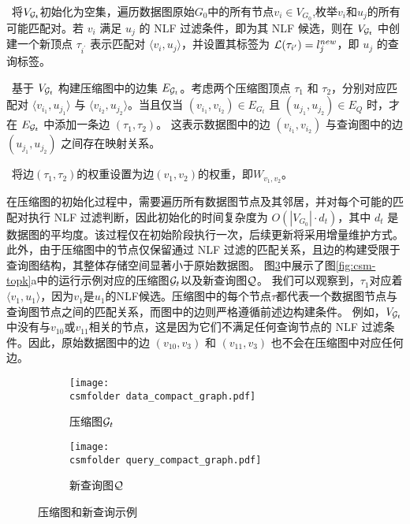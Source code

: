 \textbullet~将$V_{\mathcal{G}_t}$初始化为空集，遍历数据图原始$G_0$中的所有节点$v_i\in V_{G_0}$,枚举$v_i$和$u_j$的所有可能匹配对。若 $v_i$ 满足 $u_j$ 的 NLF 过滤条件，即为其 NLF 候选，则在 $V_{\mathcal{G}_t}$ 中创建一个新顶点 $\tau_{i^\prime}$ 表示匹配对 $\langle v_i, u_j \rangle$，并设置其标签为 $\mathcal{L}(\tau_{i^\prime}) = l_j^{new}$，即 $u_j$ 的查询标签。

\textbullet~基于 $V_{\mathcal{G}_t}$ 构建压缩图中的边集 $E_{\mathcal{G}_t}$。考虑两个压缩图顶点 $\tau_1$ 和 $\tau_2$，分别对应匹配对 $\langle v_{i_1}, u_{j_1} \rangle$ 与 $\langle v_{i_2}, u_{j_2} \rangle$。当且仅当 $(v_{i_1}, v_{i_2}) \in E_{G_t}$ 且 $(u_{j_1}, u_{j_2}) \in E_Q$ 时，才在 $E_{\mathcal{G}_t}$ 中添加一条边 $(\tau_1, \tau_2)$。
这表示数据图中的边 $(v_{i_1}, v_{i_2})$ 与查询图中的边 $(u_{j_1}, u_{j_2})$ 之间存在映射关系。

\textbullet~将边$(\tau_1, \tau_2)$的权重设置为边$(v_1, v_2)$的权重，即$W_{v_1, v_2}$。

在压缩图的初始化过程中，需要遍历所有数据图节点及其邻居，并对每个可能的匹配对执行 NLF 过滤判断，因此初始化的时间复杂度为 $O(|V_{G_0}| \cdot d_t)$，其中 $d_t$ 是数据图的平均度。该过程仅在初始阶段执行一次，后续更新将采用增量维护方式。此外，由于压缩图中的节点仅保留通过 NLF 过滤的匹配关系，且边的构建受限于查询图结构，其整体存储空间显著小于原始数据图。
图\ref{fig:compact}中展示了图\ref{fig:csm-topk}a中的运行示例对应的压缩图$\mathcal{G}_t$以及新查询图$\mathcal{Q}$。
我们可以观察到，$\tau_1$对应着$\langle v_1, u_1 \rangle$，因为$v_1$是$u_1$的NLF候选。压缩图中的每个节点$\tau$都代表一个数据图节点与查询图节点之间的匹配关系，而图中的边则严格遵循前述边构建条件。
例如，$V_{\mathcal{G}_t}$中没有与$v_{10}$或$v_{11}$相关的节点，这是因为它们不满足任何查询节点的 NLF 过滤条件。因此，原始数据图中的边 $(v_{10}, v_3)$ 和 $(v_{11}, v_3)$ 也不会在压缩图中对应任何边。

\begin{figure}[h!]
\def\wscorevone{0.62}
\centering
\begin{subfigure}[t]{\wscorevone\linewidth}
\centering
\resizebox{\linewidth}{!}
{
\texttt{[image: \\csmfolder data\_compact\_graph.pdf]}
}
\caption{压缩图$\mathcal{G}_t$}
\label{fig:data_compact_graph}
\end{subfigure}
\begin{subfigure}[t]{0.35\linewidth}
\centering
\resizebox{\linewidth}{!}
{
\texttt{[image: \\csmfolder query\_compact\_graph.pdf]}
}
\caption{新查询图$\mathcal{Q}$}
\label{fig:query_compact_graph}
\end{subfigure}
\caption{压缩图和新查询示例}
\label{fig:compact}
\end{figure}


